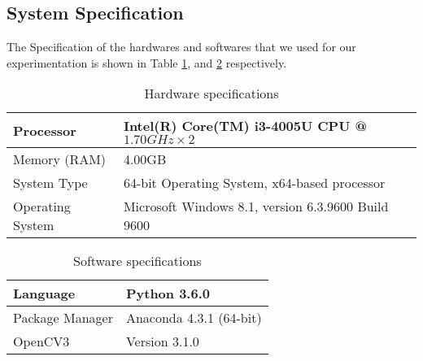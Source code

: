
\subsection{System Specification}
The Specification of the hardwares and softwares that we used for our experimentation is shown in Table \ref{table:HardwareSpecification}, and \ref{table:SoftwareSpecification} respectively.

\begin{table}[hb]
\centering
\caption{Hardware specifications}
\label{table:HardwareSpecification}
\begin{tabular}{|l|l|}
\hline
Processor & Intel(R) Core(TM) i3-4005U CPU @ $1.70GHz \times 2$ \\
\hline
Memory (RAM) & 4.00GB \\ 
\hline
System Type & 64-bit Operating System, x64-based processor \\ 
\hline
Operating System & Microsoft Windows 8.1, version 6.3.9600 Build 9600 \\
\hline 
\end{tabular}
\end{table} 

\begin{table}[hb]
\centering
\caption{Software specifications}
\label{table:SoftwareSpecification}
\begin{tabular}{|l|l|}
\hline
Language & Python 3.6.0 \\ 
\hline
Package Manager & Anaconda 4.3.1 (64-bit) \\ 
\hline
OpenCV3 & Version 3.1.0 \\
\hline
\end{tabular}
\end{table} 


